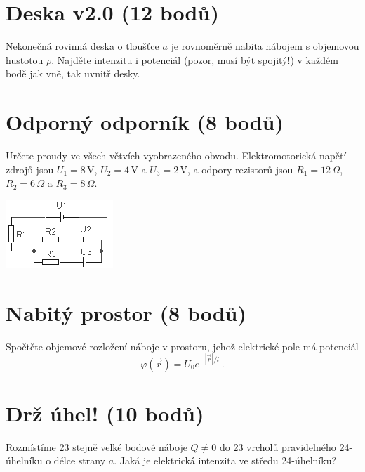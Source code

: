\documentclass[10pt,a4paper,landscape]{article}
\begin{document}
\begin{multicols}{2}[]
\section{Deska v2.0 (12 bodů)}
Nekonečná rovinná deska o tloušťce $a$ je rovnoměrně nabita nábojem s objemovou hustotou $\rho$. Najděte intenzitu i potenciál (pozor, musí být spojitý!) v každém bodě jak vně, tak uvnitř desky.

\section{Odporný odporník (8 bodů)}
\begin{minipage}{0.65\linewidth}
Určete proudy ve všech větvích vyobrazeného obvodu. Elektromotorická napětí zdrojů jsou $U_1 = 8\,\mathrm{V}$, $U_2 = 4\,\mathrm{V}$ a $U_3 = 2\,\mathrm{V}$, a odpory rezistorů jsou $R_1 = 12\,\Omega$, $R_2 = 6\,\Omega$ a $R_3 = 8\,\Omega$.
\end{minipage}
\hspace{0.05\linewidth}
\begin{minipage}{0.3\linewidth}
\includegraphics[width=\textwidth]{obvod.png}
\end{minipage}

\section{Nabitý prostor (8 bodů)}
Spočtěte objemové rozložení náboje v prostoru, jehož elektrické pole má potenciál
\begin{equation}
\varphi\left(\vec{r}\right) = U_0 e^{-\left|\vec{r}\right|/l} ~.
\end{equation}

\section{Drž úhel! (10 bodů)}
Rozmístíme 23 stejně velké bodové náboje $Q\neq 0$ do 23 vrcholů pravidelného 24-úhelníku o délce strany $a$. Jaká je elektrická intenzita ve středu 24-úhelníku?


\end{multicols}
\end{document}
